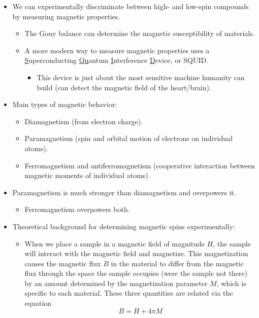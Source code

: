 \documentclass[../notes.tex]{subfiles}
\begin{document}
\begin{itemize}
    \item We can experimentally discriminate between high- and low-spin compounds by measuring magnetic properties.
    \begin{itemize}
        \item The Gouy balance can determine the magnetic susceptibility of materials.
        \item A more modern way to measure magnetic properties uses a \underline{S}uperconducting \underline{Qu}antum \underline{I}nterference \underline{D}evice, or SQUID.
        \begin{itemize}
            \item This device is just about the most sensitive machine humanity can build (can detect the magnetic field of the heart/brain).
        \end{itemize}
    \end{itemize}
    \item Main types of magnetic behavior:
    \begin{itemize}
        \item Diamagnetism (from electron charge).
        \item Paramagnetism (spin and orbital motion of electrons on individual atoms).
        \item Ferromagnetism and antiferromagnetism (cooperative interaction between magnetic moments of individual atoms).
    \end{itemize}
    \item Paramagnetism is much stronger than diamagnetism and overpowers it.
    \begin{itemize}
        \item Ferromagnetism overpowers both.
    \end{itemize}
    \item Theoretical background for determining magnetic spins experimentally:
    \begin{itemize}
        \item When we place a sample in a magnetic field of magnitude $H$, the sample will interact with the magnetic field and magnetize. This magnetization causes the magnetic flux $B$ in the material to differ from the magnetic flux through the space the sample occupies (were the sample not there) by an amount determined by the magnetization parameter $M$, which is specific to each material. These three quantities are related via the equation
        \begin{equation*}
            B = H+4\pi M
        \end{equation*}

\end{itemize}
\end{itemize}
\end{document}

